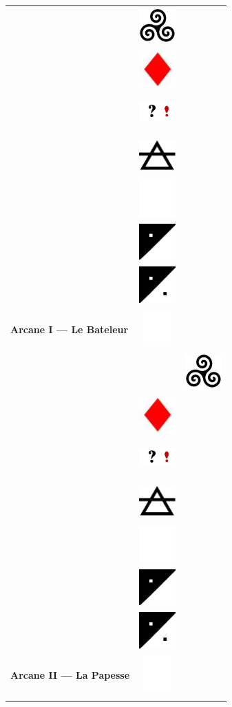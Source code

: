 \documentclass[11pt,oneside,a4paper]{article} %
\newcommand{\colornone}{ \includegraphics[width=1.40cm, height=1.40cm]{../../tarotData/img/color_none.jpg} }
\newcommand{\colorcarr}{ \includegraphics[width=1.40cm, height=1.40cm]{../../tarotData/img/color_carreau.jpg} }
\newcommand{\colorinte}{ \includegraphics[width=1.40cm, height=1.40cm]{../../tarotData/img/color_interrexclam.jpg} }
\newcommand{\elementair}{ \includegraphics[width=1.40cm, height=1.40cm]{../../tarotData/img/element_air.jpg} }
\newcommand{\tricurve}{ \includegraphics[width=1.40cm, height=1.40cm]{../img/tricurve.jpg} }
\newcommand{\partEmpt}{ \includegraphics[width=1.40cm, height=1.40cm]{../img/CountEmptyPart.png} }
\newcommand{\partHalf}{ \includegraphics[width=1.40cm, height=1.40cm]{../img/CountHalfPart.png} }
\newcommand{\partPlai}{ \includegraphics[width=1.40cm, height=1.40cm]{../img/CountPlainPart.png} }
\begin{document}
\begin{longtable}[ht]{ l l l }
{\begin{tabular}[ht]{ @{}m{4.50cm}@{} @{}p{1.50cm}@{} }
											&	\tricurve		\\
											&	\colorcarr		\\
											&	\colorinte		\\
											&	\elementair		\\
											&	\partEmpt		\\
											&	\partHalf		\\
											&	\partPlai		\\
			\hline
			\textbf{\footnotesize Arcane I --- Le Bateleur}	&	\colornone		\\
		\end{tabular}
	}	&
	\Ovalbox{%
		\begin{tabular}[ht]{ @{}m{4.50cm}@{} @{}p{1.50cm}@{} }
			\multirow{ 7 }{4.45cm}{ \includegraphics[width=4.45cm, height=9.00cm]{../../tarotData/img/2_LaPapesse.jpg} \vfill } 
											&	\tricurve		\\
											&	\colorcarr		\\
											&	\colorinte		\\
											&	\elementair		\\
											&	\partEmpt		\\
											&	\partHalf		\\
											&	\partPlai		\\
			\hline
			\textbf{\footnotesize Arcane II --- La Papesse}	&	\colornone		\\
		\end{tabular}
	}	\\
	
	

\end{longtable}
\end{document}
